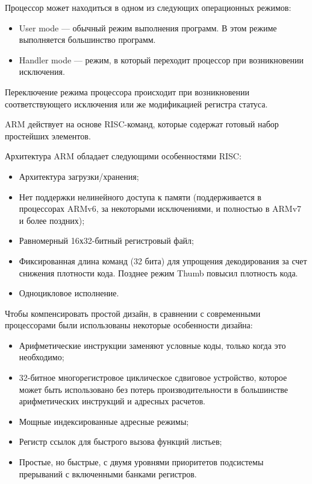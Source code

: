 \documentclass[12pt, oneside]{altsu-report}
\begin{document}
Процессор может находиться в одном из следующих операционных режимов:

\begin{itemize}
    \item User mode --- обычный режим выполнения программ. В этом режиме выполняется большинство программ.

    \item Handler mode --- режим, в который переходит процессор при возникновении исключения.
\end{itemize}

Переключение режима процессора происходит при возникновении соответствующего исключения или же модификацией регистра статуса.

ARM действует на основе RISC-команд, которые содержат готовый набор простейших элементов.~\cite{ARM}

Архитектура ARM обладает следующими особенностями RISC:~\cite{wikiRUARM}

\begin{itemize}
    \item Архитектура загрузки/хранения;

    \item Нет поддержки нелинейного доступа к памяти (поддерживается в процессорах ARMv6, за некоторыми исключениями, и полностью в ARMv7 и более поздних);

    \item Равномерный 16х32-битный регистровый файл;

    \item Фиксированная длина команд (32 бита) для упрощения декодирования за счет снижения плотности кода. Позднее режим Thumb повысил плотность кода.

    \item Одноцикловое исполнение.
\end{itemize}

Чтобы компенсировать простой дизайн, в сравнении с современными процессорами были использованы некоторые особенности дизайна:

\begin{itemize}
    \item Арифметические инструкции заменяют условные коды, только когда это необходимо;

    \item 32-битное многорегистровое циклическое сдвиговое устройство, которое может быть использовано без потерь производительности в большинстве арифметических инструкций и адресных расчетов.

    \item Мощные индексированные адресные режимы;

    \item Регистр ссылок для быстрого вызова функций листьев;

    \item Простые, но быстрые, с двумя уровнями приоритетов подсистемы прерываний с включенными банками регистров.
\end{itemize}
\end{document}
